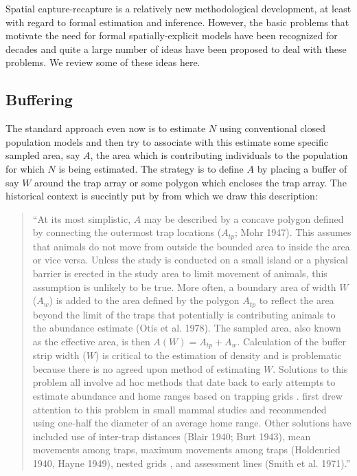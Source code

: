Spatial capture-recapture is a relatively new methodological
development, at least with regard to formal estimation and
inference. However, the basic problems that motivate the need for
formal spatially-explicit models have been recognized for decades and
quite a large number of ideas have been proposed to deal with these
problems. We review some of these ideas here.


\subsection{Buffering}

 The standard approach even now is to estimate $N$ using
conventional closed population models \citep{otis_etal:1978} and then
try to associate with this estimate some specific sampled area, say $A$,
the area which is contributing individuals to the population for which
$N$ is being estimated. The strategy is to define $A$ by placing a buffer
of say $W$ around the trap array or some polygon which encloses the trap
array. The historical context is succintly put by \citep{obrien:2011}
from which we draw this description:

\begin{quote}
  ``At its most simplistic, $A$ may be described by a concave polygon
  defined by connecting the outermost trap locations ($A_{tp}$; Mohr
  1947). This assumes that animals do not move from outside the
  bounded area to inside the area or vice versa. Unless the study is
  conducted on a small island or a physical barrier is erected in the
  study area to limit movement of animals, this assumption is unlikely
  to be true. More often, a boundary area of width $W$ ($A_{w}$) is added to
  the area defined by the polygon $A_{tp}$ to reflect the area beyond the
  limit of the traps that potentially is contributing animals to the
  abundance estimate (Otis et al. 1978). The sampled area, also known
  as the effective area, is then $A(W) = A_{tp} + A_{w}$. Calculation of the
  buffer strip width ($W$) is critical to the estimation of density and
  is problematic because there is no agreed upon method of estimating
  $W$. Solutions to this problem all involve ad hoc methods that date
  back to early attempts to estimate abundance and home ranges based
  on trapping grids 
  \citep[see][]{hayne:1949}. \citet{dice:1938} first drew attention
  to this problem in small mammal studies and recommended using
  one-half the diameter of an average home range. Other solutions have
  included use of inter-trap distances (Blair 1940; Burt 1943), mean
  movements among traps, maximum movements among traps (Holdenried
  1940, Hayne 1949), nested grids \citep{otis_etal:1978}, and assessment
  lines (Smith et al. 1971).''
\end{quote}

